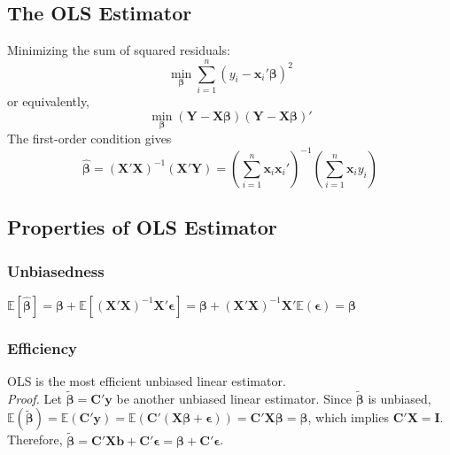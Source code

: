 \documentclass[%
 aip,
 jmp,%
 amsmath,amssymb,
 reprint,%
]{revtex4-1}
\def\b{\beta}
\def\e{\epsilon}
\def\s{\sigma}
\def\E{\mathbb{E}}
\def\Var{\mathrm{Var}}
\def\h{\hat}
\def\t{\tilde}
\newcommand{\sumn}[1]{\sum_{i=1}^{n} #1}
\newcommand{\mat}[1]{\bm{#1}}
\renewcommand{\vec}[1]{\bm{#1}}
\begin{document}
\subsection{The OLS Estimator}

Minimizing the sum of squared residuals:
$$ \min_{\vec\b} \sumn (y_i - \vec x_i'\vec\b)^2 $$
or equivalently,
$$ \min_{\vec\b} (\vec Y - \mat X \vec\b)(\vec Y - \vec X\vec\b)' $$
The first-order condition gives
$$ \vec{\h\b} = (\mat X' \mat X)^{-1}(\mat X' \vec Y) = \left(\sumn \vec x_i \vec x_i'\right)^{-1} \left(\sumn \vec x_i y_i \right) $$

\subsection{Properties of OLS Estimator}
\subsubsection{Unbiasedness}
$\E[\vec{\h\b}] = \vec\b + \E[(\mat X' \mat X)^{-1}\mat X' \vec \e]
  = \vec\b + (\mat X' \mat X)^{-1}\mat X' \E(\vec \e)= \vec\b$


\subsubsection{Efficiency}
OLS is the most efficient unbiased linear estimator. \\

\emph{Proof.} Let $\vec{\t\b}=\mat C'\vec y$ be another unbiased linear estimator.
Since $\vec{\t\b}$ is unbiased, $\E(\vec{\t\b})=\E(\mat C'\vec y)=\E(\mat C' (\mat X\vec \b + \vec\e)) = \mat C'\mat X \vec\b = \vec\b$,
which implies $\mat C' \mat X = \mat I$.
Therefore, $\vec{\t\b}=\mat C' \mat X \vec b + \mat C'\vec \e = \vec\b + \mat C'\vec \e$.

\end{document}
